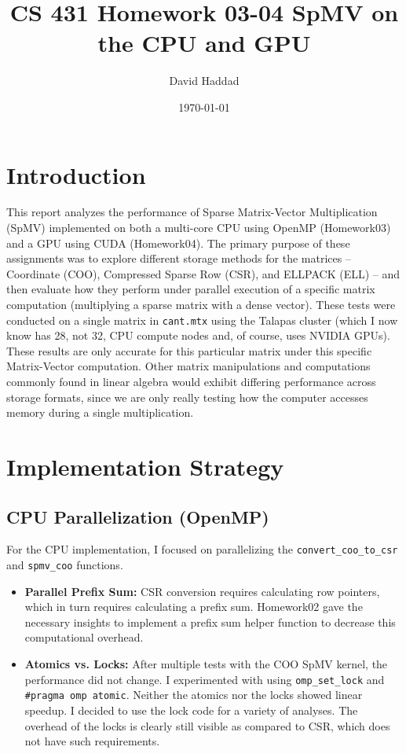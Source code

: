 \documentclass[11pt, letterpaper]{article}
\title{CS 431 Homework 03-04 SpMV on the CPU and GPU}
\author{David Haddad}
\date{\today}
\begin{document}
\maketitle

\section{Introduction}
This report analyzes the performance of Sparse Matrix-Vector Multiplication (SpMV) implemented on both a multi-core CPU using OpenMP (Homework03) and a GPU using CUDA (Homework04). The primary purpose of these assignments was to explore different storage methods for the matrices -- Coordinate (COO), Compressed Sparse Row (CSR), and ELLPACK (ELL) -- and then evaluate how they perform under parallel execution of a specific matrix computation (multiplying a sparse matrix with a dense vector). These tests were conducted on a single matrix in \texttt{cant.mtx} using the Talapas cluster (which I now know has 28, not 32, CPU compute nodes and, of course, uses NVIDIA GPUs). These results are only accurate for this particular matrix under this specific Matrix-Vector computation. Other matrix manipulations and computations commonly found in linear algebra would exhibit differing performance across storage formats, since we are only really testing how the computer accesses memory during a single multiplication.

\section{Implementation Strategy}
\subsection{CPU Parallelization (OpenMP)}
For the CPU implementation, I focused on parallelizing the \texttt{convert\_coo\_to\_csr} and \texttt{spmv\_coo} functions.
\begin{itemize}
    \item \textbf{Parallel Prefix Sum:} CSR conversion requires calculating row pointers, which in turn requires calculating a prefix sum. Homework02 gave the necessary insights to implement a prefix sum helper function to decrease this computational overhead.
    \item \textbf{Atomics vs. Locks:} After multiple tests with the COO SpMV kernel, the performance did not change. I experimented with using \texttt{omp\_set\_lock} and \texttt{\#pragma omp atomic}. Neither the atomics nor the locks showed linear speedup. I decided to use the lock code for a variety of analyses. The overhead of the locks is clearly still visible as compared to CSR, which does not have such requirements. 
\end{itemize}
\end{document}

